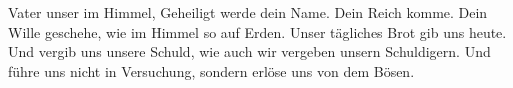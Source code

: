 \lettrine[lines=3]{V}{}ater unser im Himmel,
Geheiligt werde dein Name.
Dein Reich komme.
Dein Wille geschehe,
wie im Himmel so auf Erden.
Unser tägliches Brot gib uns heute.
Und vergib uns unsere Schuld,
wie auch wir vergeben unsern Schuldigern.
Und führe uns nicht in Versuchung,
sondern erlöse uns von dem Bösen.